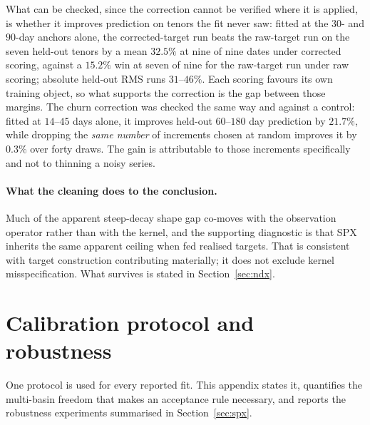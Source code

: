 \documentclass[11pt]{article}
\providecommand{\1}{\mathbf 1}
\begin{document}
What can be checked, since the correction cannot be verified where it is applied, is whether it
improves prediction on tenors the fit never saw: fitted at the $30$- and
$90$-day anchors alone, the corrected-target run beats the raw-target run on the seven held-out
tenors by a mean $32.5\%$ at nine of nine dates under corrected scoring, against a $15.2\%$ win at
seven of nine for the raw-target run under raw scoring; absolute held-out RMS runs $31$--$46\%$.
Each scoring favours its own training object, so what supports the correction is the gap between
those margins. The churn correction was checked the same
way and against a control: fitted at $14$--$45$ days alone, it improves held-out $60$--$180$ day
prediction by $21.7\%$, while dropping the \emph{same number} of increments chosen at random improves
it by $0.3\%$ over forty draws. The gain is attributable to those increments specifically and not to
thinning a noisy series.

\paragraph{What the cleaning does to the conclusion.} Much of the apparent steep-decay shape gap
co-moves with the observation operator rather than with the kernel, and the supporting diagnostic is
that SPX inherits the same apparent ceiling when fed realised targets. That is consistent with target
construction contributing materially; it does not exclude kernel misspecification. What survives is
stated in Section~\ref{sec:ndx}.

\section{Calibration protocol and robustness}
\label{app:protocol}
One protocol is used for every reported fit. This appendix states it, quantifies the multi-basin
freedom that makes an acceptance rule necessary, and reports the robustness experiments summarised in
Section~\ref{sec:spx}.
\end{document}
